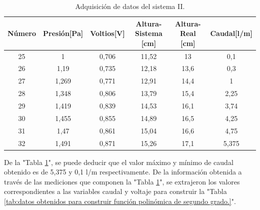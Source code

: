 \begin{table}[htpb]
	\centering
	\caption[Adquisición de datos del sistema II]{Adquisición de datos del sistema II.}
	\begin{tabular}{c c c c c c}    
		\toprule
		\textbf{Número}   & \textbf{Presión[Pa]}  & \textbf{Voltios[V]} & \textbf{Altura-Sistema [cm]} & \textbf{Altura-Real [cm]} & \textbf{Caudal[l/m]} \\
		\midrule
		25  & 1     & 0,706  & 11,52  & 13   &  0,1\\
		26  & 1,19  & 0,735  & 12,18  & 13,6 &  0,3\\
		27  & 1,269 & 0,771  & 12,91  & 14,4 &  1 \\
		28  & 1,348 & 0,806  & 13,79  & 15,4 &  2,25 \\
		29  & 1,419 & 0,839	 & 14,53  & 16,1 &  3,74\\
		30  & 1,455 & 0,855  & 14,89  & 16,5 &  4,25\\
		31  & 1,47  & 0,861	 & 15,04  & 16,6 &  4,75\\
		32  & 1,491 & 0,871	 & 15,26  & 17,1 &  5,375\\
		
		\bottomrule
		\hline
	\end{tabular}
	\label{tab:adquisición de datos del sistema II.}
\end{table}

\vspace{3cm}

De la "Tabla \ref{tab:adquisición de datos del sistema II.}", se puede deducir que el valor máximo y mínimo de caudal obtenido es de 5,375 y 0,1 l/m respectivamente.
De la información obtenida a través de las mediciones que componen la "Tabla \ref{tab:adquisición de datos del sistema II.}", se extrajeron los valores correspondientes a las variables caudal y voltaje para construir la "Tabla \ref{tab:datos obtenidos para construir función polinómica de segundo grado.}".

